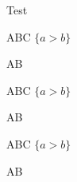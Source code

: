 \documentclass{article}
\begin{document}
\begin{tad}{Test}
    \begin{observadores}
        \signature{$f$}{A}{B}{C} \hfill{$\{a > b\}$}\par
        \signature{$g$}{A}{B} \par
    \end{observadores}
    
    \begin{generadores}
        \signature{$f$}{A}{B}{C} \hfill{$\{a > b\}$}\par
        \signature{$g$}{A}{B} \par
    \end{generadores}

    \begin{operaciones}
        \signature{$f$}{A}{B}{C} \hfill{$\{a > b\}$}\par
        \signature{$g$}{A}{B} \par
    \end{operaciones}

    \begin{axiomas}
    \end{axiomas}

    
\end{tad}
\end{document}
